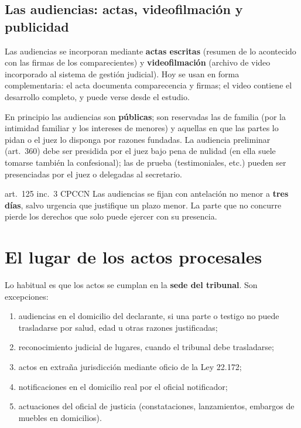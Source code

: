 \documentclass[12pt,oneside]{book}
\begin{document}
\subsection{Las audiencias: actas, videofilmación y publicidad}

Las audiencias se incorporan mediante \textbf{actas escritas} (resumen de lo acontecido con las firmas de los comparecientes) y \textbf{videofilmación} (archivo de video incorporado al sistema de gestión judicial). Hoy se usan en forma complementaria: el acta documenta comparecencia y firmas; el video contiene el desarrollo completo, y puede verse desde el estudio.

En principio las audiencias son \textbf{públicas}; son reservadas las de familia (por la intimidad familiar y los intereses de menores) y aquellas en que las partes lo pidan o el juez lo disponga por razones fundadas. La audiencia preliminar (art.~360) debe ser presidida por el juez bajo pena de nulidad (en ella suele tomarse también la confesional); las de prueba (testimoniales, etc.) pueden ser presenciadas por el juez o delegadas al secretario.

\begin{norma}{art.~125 inc.~3 CPCCN}
Las audiencias se fijan con antelación no menor a \textbf{tres días}, salvo urgencia que justifique un plazo menor. La parte que no concurre pierde los derechos que solo puede ejercer con su presencia.
\end{norma}

\section{El lugar de los actos procesales}

Lo habitual es que los actos se cumplan en la \textbf{sede del tribunal}. Son excepciones:

\begin{enumerate}[label=\alph*)]
\item audiencias en el domicilio del declarante, si una parte o testigo no puede trasladarse por salud, edad u otras razones justificadas;
\item reconocimiento judicial de lugares, cuando el tribunal debe trasladarse;
\item actos en extraña jurisdicción mediante oficio de la Ley 22.172;
\item notificaciones en el domicilio real por el oficial notificador;
\item actuaciones del oficial de justicia (constataciones, lanzamientos, embargos de muebles en domicilios).
\end{enumerate}
\end{document}
